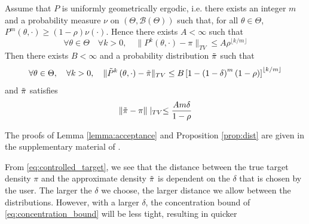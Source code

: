 \begin{proposition}\label{prop:dist}
Assume that $P$ is uniformly geometrically ergodic, i.e. there exists an integer $m$ and a probability measure $\nu$ on $\left(\Theta, \mathcal{B}\left(\Theta\right)\right)$ such that, for all $\theta \in \Theta$, $P^m\left(\theta, \cdot\right) \geq \left(1 - \rho\right)\nu\left(\cdot\right)$. Hence there exists $A < \infty$ such that
\begin{equation*}
    \forall \theta \in \Theta \quad \forall k > 0, \quad \lVert P^k\left(\theta, \cdot\right) - \pi \rVert_{TV} \leq A\rho^{\lfloor k/m \rfloor} 
\end{equation*}
Then there exists $B < \infty$ and a probability distribution $\Tilde{\pi}$ such that 
\begin{equation*}
    \forall \theta \in \Theta, \quad \forall k > 0, \quad \lVert \Tilde{P}^k\left(\theta, \cdot\right) - \Tilde{\pi}\rVert_{TV} \leq B\left[ 1 - \left(1- \delta\right)^m \left(1-\rho\right)\right]^{\lfloor k/m\rfloor}
\end{equation*}
and $\Tilde{\pi}$ satisfies 
\begin{equation*}\label{eq:controlled_target}
    \lVert \Tilde{\pi} - \pi \rVert \mid_{TV} \leq \frac{A m\delta}{1-\rho} 
\end{equation*}
\end{proposition}
The proofs of Lemma \ref{lemma:acceptance} and Proposition \ref{prop:dist} are given in the supplementary material of \cite{Bardenet:2}. 

From \eqref{eq:controlled_target}, we see that the distance between the true target density $\pi$ and the approximate density $\Tilde{\pi}$ is dependent on the $\delta$ that is chosen by the user. The larger the $\delta$ we choose, the larger distance we allow between the distributions. However, with a larger $\delta$, the concentration bound of  \eqref{eq:concentration_bound} will be less tight, resulting in quicker 


